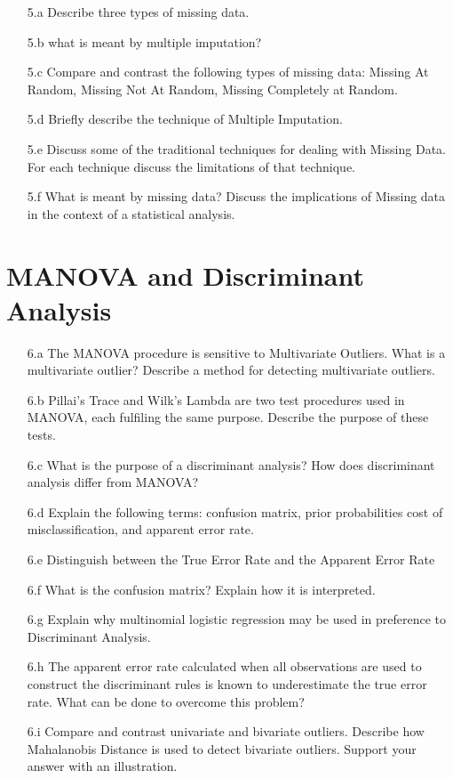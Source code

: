 \documentclass[a4paper,12pt]{article}
\begin{document}
\begin{itemize}
\item[5.a] Describe three types of missing data.
\item[5.b] what is meant by multiple imputation?
\item[5.c] Compare and contrast the following types of missing data: Missing At Random, Missing
Not At Random, Missing Completely at Random.
\item[5.d]Briefly describe the technique of Multiple Imputation.
\item[5.e] Discuss some of the traditional techniques for dealing with Missing Data. For each technique discuss the limitations of that technique.
\item[5.f] What is meant by missing data? Discuss the implications of Missing data in the context of a statistical analysis.
\end{itemize}



\section*{MANOVA and Discriminant Analysis}
\begin{itemize}
\item[6.a] The MANOVA procedure is sensitive to Multivariate Outliers. What is a multivariate outlier? Describe a method for detecting multivariate outliers.

\item[6.b] Pillai's Trace and Wilk's Lambda are two test procedures used in MANOVA, each fulfiling the same purpose.
Describe the purpose of these tests.

\item[6.c] What is the purpose of a discriminant analysis? How does discriminant analysis differ from MANOVA?

\item[6.d] Explain the following terms: confusion matrix, prior probabilities cost of misclassification, and apparent error rate.

\item[6.e] Distinguish between the True Error Rate and the Apparent Error Rate

\item[6.f]  What is the confusion matrix? Explain how it is interpreted.

\item[6.g] Explain why multinomial logistic regression may be used in preference to Discriminant Analysis.

\item[6.h] The apparent error rate calculated when all observations are used to construct
the discriminant rules is known to underestimate the true error rate. What can be done
to overcome this problem?

\item[6.i] Compare and contrast univariate and bivariate outliers. Describe how Mahalanobis Distance is used to detect bivariate outliers. Support your answer with an illustration.

\end{itemize}
\end{document}
